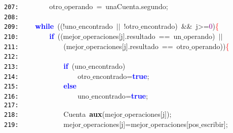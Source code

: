\documentclass[a4paper,10pt]{scrartcl}
\begin{document}
{   \mbox{}\texttt{\textcolor{Black}{207:}} \ \ \ \ \ \ \ \ otro$\_$operando\ \textcolor{BrickRed}{=}\ unaCuenta\textcolor{BrickRed}{.}segundo\textcolor{BrickRed}{;} \\
   \mbox{}\texttt{\textcolor{Black}{208:}} \ \ \ \ \ \ \ \  \\
   \mbox{}\texttt{\textcolor{Black}{209:}} \ \ \ \ \textbf{\textcolor{Blue}{while}}\ \textcolor{BrickRed}{((!}uno$\_$encontrado\ \textcolor{BrickRed}{$|$$|$}\ \textcolor{BrickRed}{!}otro$\_$encontrado\textcolor{BrickRed}{)}\ \textcolor{BrickRed}{\&\&}\ j\textcolor{BrickRed}{\textgreater{}=}\textcolor{Purple}{0}\textcolor{BrickRed}{)}\textcolor{Red}{\{} \\
   \mbox{}\texttt{\textcolor{Black}{210:}} \ \ \ \ \ \ \ \ \textbf{\textcolor{Blue}{if}}\ \textcolor{BrickRed}{((}mejor$\_$operaciones\textcolor{BrickRed}{[}j\textcolor{BrickRed}{].}resultado\ \textcolor{BrickRed}{==}\ un$\_$operando\textcolor{BrickRed}{)}\ \textcolor{BrickRed}{$|$$|$}\  \\
   \mbox{}\texttt{\textcolor{Black}{211:}} \ \ \ \ \ \ \ \ \ \ \ \ \textcolor{BrickRed}{(}mejor$\_$operaciones\textcolor{BrickRed}{[}j\textcolor{BrickRed}{].}resultado\ \textcolor{BrickRed}{==}\ otro$\_$operando\textcolor{BrickRed}{))}\textcolor{Red}{\{} \\
   \mbox{}\texttt{\textcolor{Black}{212:}} \ \ \ \ \ \  \\
   \mbox{}\texttt{\textcolor{Black}{213:}} \ \ \ \ \ \ \ \ \ \ \ \ \textbf{\textcolor{Blue}{if}}\ \textcolor{BrickRed}{(}uno$\_$encontrado\textcolor{BrickRed}{)} \\
   \mbox{}\texttt{\textcolor{Black}{214:}} \ \ \ \ \ \ \ \ \ \ \ \ \ \ \ \ otro$\_$encontrado\textcolor{BrickRed}{=}\textbf{\textcolor{Blue}{true}}\textcolor{BrickRed}{;} \\
   \mbox{}\texttt{\textcolor{Black}{215:}} \ \ \ \ \ \ \ \ \ \ \ \ \textbf{\textcolor{Blue}{else}} \\
   \mbox{}\texttt{\textcolor{Black}{216:}} \ \ \ \ \ \ \ \ \ \ \ \ \ \ \ \ uno$\_$encontrado\textcolor{BrickRed}{=}\textbf{\textcolor{Blue}{true}}\textcolor{BrickRed}{;} \\
   \mbox{}\texttt{\textcolor{Black}{217:}}  \\
   \mbox{}\texttt{\textcolor{Black}{218:}} \ \ \ \ \ \ \ \ \ \ \ \ \textcolor{TealBlue}{Cuenta}\ \textbf{\textcolor{Black}{aux}}\textcolor{BrickRed}{(}mejor$\_$operaciones\textcolor{BrickRed}{[}j\textcolor{BrickRed}{]);} \\
   \mbox{}\texttt{\textcolor{Black}{219:}} \ \ \ \ \ \ \ \ \ \ \ \ mejor$\_$operaciones\textcolor{BrickRed}{[}j\textcolor{BrickRed}{]=}mejor$\_$operaciones\textcolor{BrickRed}{[}pos$\_$escribir\textcolor{BrickRed}{];} \\
}
\end{document}
